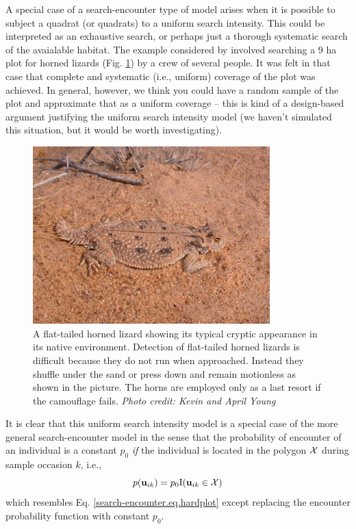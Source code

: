 A special case of a search-encounter type of model arises when it is
possible to subject a quadrat (or quadrats) to a uniform search
intensity. This could be interpreted as an exhaustive search, or
perhaps just a thorough systematic search of the avaialable habitat.
The example considered by \citet{royle_young:2008} involved searching
 a 9 ha plot for horned lizards (Fig.
\ref{searchencounter.fig.hornylizard}) by a crew of several people. It
was felt in that case that complete and systematic (i.e., uniform) coverage of the plot was
achieved. In general, however, we think you could have a random sample
of the plot and approximate that as a uniform coverage -- this is kind
of a design-based argument justifying the uniform search intensity
model (we haven't simulated this situation, but it would be worth
investigating).

\begin{figure}[ht]
\centering
\includegraphics[width=3.6in,height=2.7in]{Ch15-searchencounter/figs/horny_lizard.jpg}
\caption{A flat-tailed horned lizard showing its typical cryptic
  appearance in its native environment.  Detection of flat-tailed
  horned lizards is difficult because they do not run when
  approached. Instead they shuffle under the sand or press down and
  remain motionless as shown in the picture.  The horns are employed
  only as a last resort if the camouflage fails.  {\it Photo credit:
    Kevin and April Young} }
\label{searchencounter.fig.hornylizard}
\end{figure}

It is clear that this uniform search intensity model is a special case
of the more general search-encounter model in the sense that the
probability of encounter of an individual is a constant $p_{0}$ {\it
  if} the individual is located in the polygon ${\cal X}$ during
sample occasion $k$, i.e.,
\[
p({\bf u}_{ik}) = p_{0} \mbox{I}({\bf u}_{ik} \in {\cal X})
\]
which resembles Eq. \ref{search-encounter.eq.hardplot} except
replacing the encounter probability function with constant $p_{0}$.

